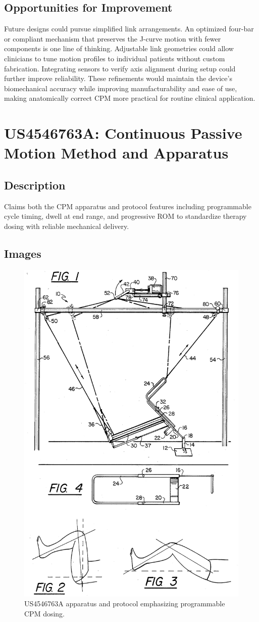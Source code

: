 \documentclass[11pt]{article}
\begin{document}
\subsection{Opportunities for Improvement}
Future designs could pursue simplified link arrangements. An optimized four-bar or compliant mechanism that preserves the J-curve motion with fewer components is one line of thinking. Adjustable link geometries could allow clinicians to tune motion profiles to individual patients without custom fabrication. Integrating sensors to verify axis alignment during setup could further improve reliability. These refinements would maintain the device's biomechanical accuracy while improving manufacturability and ease of use, making anatomically correct CPM more practical for routine clinical application.

\section{US4546763A: Continuous Passive Motion Method and Apparatus}
\subsection{Description}
Claims both the CPM apparatus and protocol features including programmable cycle timing, dwell at end range, and progressive ROM to standardize therapy dosing with reliable mechanical delivery.
\subsection{Images}
\begin{figure}[H]
  \centering
  \includegraphics[width=0.54\linewidth]{US4546763-drawings-page-2.png}
  \caption{US4546763A apparatus and protocol emphasizing programmable CPM dosing.}
  \label{fig:US4546763A}
\end{figure}
\end{document}
